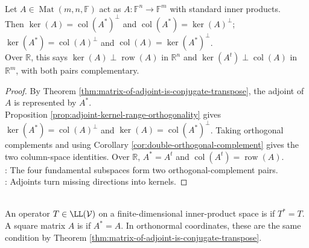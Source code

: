 \begin{corollary} \label{cor:matrix-fundamental-subspaces-orthogonal-complements} \\
Let $A\in\operatorname{Mat}(m,n,\mathbb{F})$ act as $A:\mathbb{F}^n\to\mathbb{F}^m$ with standard inner products.\\
Then $\ker(A)=\operatorname{col}(A^*)^{\perp}$ and $\operatorname{col}(A^*)=\ker(A)^{\perp}$; $\ker(A^*)=\operatorname{col}(A)^{\perp}$ and $\operatorname{col}(A)=\ker(A^*)^{\perp}$.\\
Over $\mathbb{R}$, this says $\ker(A)\perp\operatorname{row}(A)$ in $\mathbb{R}^n$ and $\ker(A^t)\perp\operatorname{col}(A)$ in $\mathbb{R}^m$, with both pairs complementary.
\begin{proof}
By Theorem \ref{thm:matrix-of-adjoint-is-conjugate-transpose}, the adjoint of $A$ is represented by $A^*$.\\
Proposition \ref{prop:adjoint-kernel-range-orthogonality} gives $\ker(A^*)=\operatorname{col}(A)^{\perp}$ and $\ker(A)=\operatorname{col}(A^*)^{\perp}$. Taking orthogonal complements and using Corollary \ref{cor:double-orthogonal-complement} gives the two column-space identities. Over $\mathbb{R}$, $A^*=A^t$ and $\operatorname{col}(A^t)=\operatorname{row}(A)$.\\
: The four fundamental subspaces form two orthogonal-complement pairs.\\
: Adjoints turn missing directions into kernels.
\end{proof}
\end{corollary}

\begin{definition} \label{def:self-adjoint-hermitian} \\
An operator $T\in\LL(\mathcal{V})$ on a finite-dimensional inner-product space is  if $T^*=T$. A square matrix $A$ is  if $A^*=A$. In orthonormal coordinates, these are the same condition by Theorem \ref{thm:matrix-of-adjoint-is-conjugate-transpose}.
\end{definition}

